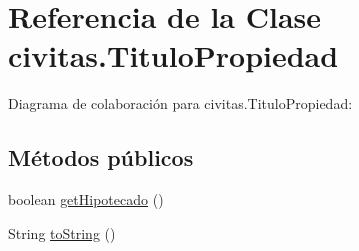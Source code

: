 \hypertarget{classcivitas_1_1TituloPropiedad}{}\section{Referencia de la Clase civitas.\+Titulo\+Propiedad}
\label{classcivitas_1_1TituloPropiedad}


Diagrama de colaboración para civitas.\+Titulo\+Propiedad\+:
\subsection*{Métodos públicos}
\begin{DoxyCompactItemize}
\item 
boolean \hyperlink{classcivitas_1_1TituloPropiedad_a10cc16f629330f82d9fb844c2a1aeac5}{get\+Hipotecado} ()
\item 
String \hyperlink{classcivitas_1_1TituloPropiedad_a89e2997e19e157b2cc1df105cdeb1020}{to\+String} ()
\end{DoxyCompactItemize}
